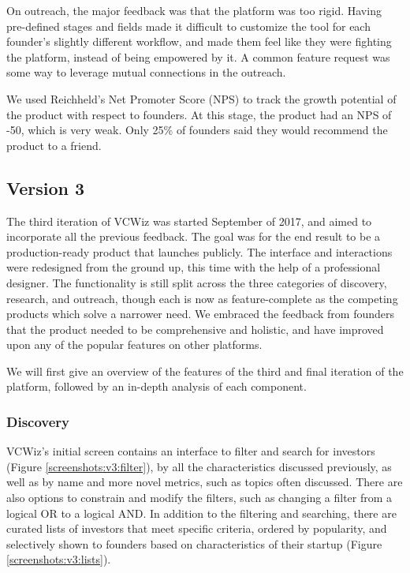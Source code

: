 On outreach, the major feedback was that the platform was too rigid. Having pre-defined stages and fields made it difficult to customize the tool for each founder's slightly different workflow, and made them feel like they were fighting the platform, instead of being empowered by it. A common feature request was some way to leverage mutual connections in the outreach.

We used Reichheld's Net Promoter Score (NPS) \cite{reichheld2003one} to track the growth potential of the product with respect to founders. At this stage, the product had an NPS of -50, which is very weak. Only 25\% of founders said they would recommend the product to a friend.

\subsection{Version 3}

The third iteration of VCWiz was started September of 2017, and aimed to incorporate all the previous feedback. The goal was for the end result to be a production-ready product that launches publicly. The interface and interactions were redesigned from the ground up, this time with the help of a professional designer. The functionality is still split across the three categories of discovery, research, and outreach, though each is now as feature-complete as the competing products which solve a narrower need. We embraced the feedback from founders that the product needed to be comprehensive and holistic, and have improved upon any of the popular features on other platforms.

We will first give an overview of the features of the third and final iteration of the platform, followed by an in-depth analysis of each component.

\subsubsection{Discovery}

VCWiz's initial screen contains an interface to filter and search for investors (Figure \ref{screenshots:v3:filter}), by all the characteristics discussed previously, as well as by name and more novel metrics, such as topics often discussed. There are also options to constrain and modify the filters, such as changing a filter from a logical OR to a logical AND. In addition to the filtering and searching, there are curated lists of investors that meet specific criteria, ordered by popularity, and selectively shown to founders based on characteristics of their startup (Figure \ref{screenshots:v3:lists}).

